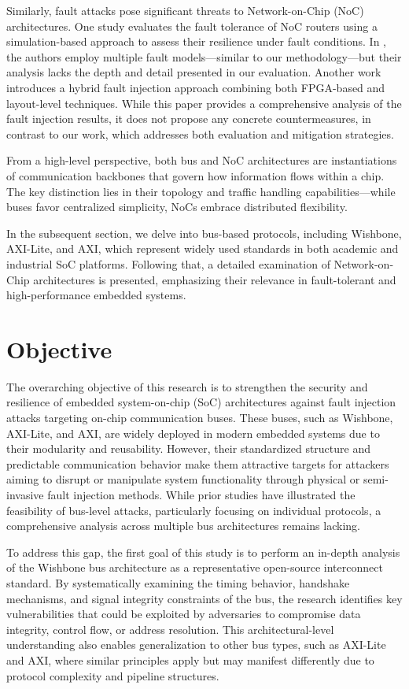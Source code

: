 Similarly, fault attacks pose significant threats to Network-on-Chip (NoC) architectures. One study evaluates the fault tolerance of NoC routers using a simulation-based approach to assess their resilience under fault conditions. In \cite{5196018}, the authors employ multiple fault models—similar to our methodology—but their analysis lacks the depth and detail presented in our evaluation. Another work \cite{8704559} introduces a hybrid fault injection approach combining both FPGA-based and layout-level techniques. While this paper provides a comprehensive analysis of the fault injection results, it does not propose any concrete countermeasures, in contrast to our work, which addresses both evaluation and mitigation strategies.

From a high-level perspective, both bus and NoC architectures are instantiations of communication backbones that govern how information flows within a chip. The key distinction lies in their topology and traffic handling capabilities—while buses favor centralized simplicity, NoCs embrace distributed flexibility.

In the subsequent section, we delve into bus-based protocols, including Wishbone, AXI-Lite, and AXI, which represent widely used standards in both academic and industrial SoC platforms. Following that, a detailed examination of Network-on-Chip architectures is presented, emphasizing their relevance in fault-tolerant and high-performance embedded systems.

\section{Objective}
The overarching objective of this research is to strengthen the security and resilience of embedded system-on-chip (SoC) architectures against fault injection attacks targeting on-chip communication buses. These buses, such as Wishbone\cite{wishbone_spec}, AXI-Lite\cite{axi_lite_spec}, and AXI\cite{axi_spec}, are widely deployed in modern embedded systems due to their modularity and reusability. However, their standardized structure and predictable communication behavior make them attractive targets for attackers aiming to disrupt or manipulate system functionality through physical or semi-invasive fault injection methods. While prior studies have illustrated the feasibility of bus-level attacks, particularly focusing on individual protocols, a comprehensive analysis across multiple bus architectures remains lacking.

To address this gap, the first goal of this study is to perform an in-depth analysis of the Wishbone bus architecture as a representative open-source interconnect standard. By systematically examining the timing behavior, handshake mechanisms, and signal integrity constraints of the bus, the research identifies key vulnerabilities that could be exploited by adversaries to compromise data integrity, control flow, or address resolution. This architectural-level understanding also enables generalization to other bus types, such as AXI-Lite and AXI, where similar principles apply but may manifest differently due to protocol complexity and pipeline structures.

